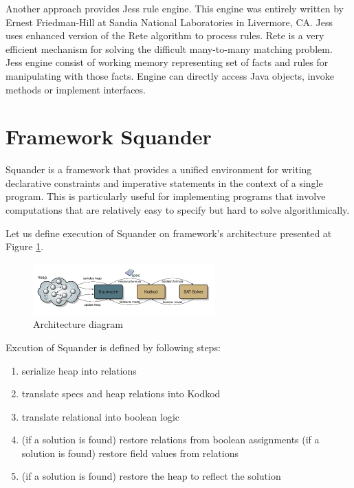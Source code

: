 \documentclass[conference]{IEEEtran}
\begin{document}
Another approach provides Jess rule engine. This engine was entirely written by
Ernest Friedman-Hill at Sandia National Laboratories in Livermore, CA. Jess uses
enhanced version of the Rete algorithm to process rules. Rete is a very
efficient mechanism for solving the difficult many-to-many matching problem.
Jess engine consist of working memory representing set of facts and rules for
manipulating with those facts. Engine can directly access Java objects,
invoke methods or implement interfaces.

\section{Framework Squander}
Squander is a framework that provides a unified environment for writing
declarative constraints and imperative statements in the context of a single
program. This is particularly useful for implementing programs that involve
computations that are relatively easy to specify but hard to solve
algorithmically\cite{milicevic:executableSpecificationsForJavaPrograms}.

Let us define execution of Squander on framework's architecture presented at
Figure \ref{fig:architecture}.

\begin{figure}[ht]
\begin{center}
\includegraphics[width=7cm]{img/architecture-diagram}
\caption{Architecture diagram}
\label{fig:architecture}
\end{center}
\end{figure}

Excution of Squander is defined by following steps\cite{web:squander}:
\begin{enumerate}
  \item serialize heap into relations
  \item translate specs and heap relations into Kodkod
  \item translate relational into boolean logic
  \item (if a solution is found) restore relations from boolean assignments
  (if a solution is found) restore field values from relations
  \item (if a solution is found) restore the heap to reflect the solution
   
\end{enumerate}
\end{document}
